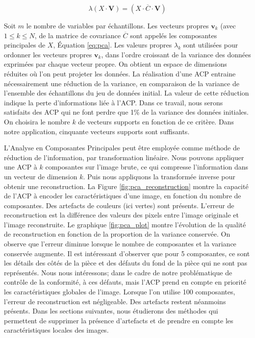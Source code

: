 \begin{equation} \label{eq:pca}
\lambda\left(X \cdot \mathbf{V}\right)=\left(X \cdot \overline{C} \cdot \mathbf{V}\right)
\end{equation}

Soit $m$ le nombre de variables par échantillons. Les vecteurs propres $\mathbf{v}_k$ (avec $1 \leq k \leq N$, de la matrice de covariance $\overline{C}$ sont appelés les composantes principales de $X$, Équation \ref{eq:pca}.
Les valeurs propres $\lambda_k$ sont utilisées pour ordonner les vecteurs propres $\mathbf{v}_k$, dans l'ordre croissant de la variance des données exprimées par chaque vecteur propre.
On obtient un espace de dimensions réduites où l'on peut projeter les données.
La réalisation d'une ACP entraine nécessairement une réduction de la variance, en comparaison de la variance de l'ensemble des échantillons du jeu de données initial.
La valeur de cette réduction indique la perte d'informations liée à l'ACP.
Dans ce travail, nous serons satisfaits des ACP qui ne font perdre que 1\% de la variance des données initiales.
On choisira le nombre $k$ de vecteurs supports en fonction de ce critère.
Dans notre application, cinquante vecteurs supports sont suffisants. 

L'Analyse en Composantes Principales peut être employée comme méthode de réduction de l'information, par transformation linéaire.
Nous pouvons appliquer une ACP à $k$ composantes sur l'image brute, ce qui compresse l'information dans un vecteur de dimension $k$.
Puis nous appliquons la transformée inverse pour obtenir une reconstruction.
La Figure \ref{fig:pca_reconstruction} montre la capacité de l'ACP à encoder les caractéristiques d'une image, en fonction du nombre de composantes.
Des artefacts de couleurs (ici vertes) sont présents.
L'erreur de reconstruction est la différence des valeurs des pixels entre l'image originale et l'image reconstruite.
Le graphique \ref{fig:pca_plot} montre l'évolution de la qualité de reconstruction en fonction de la proportion de la variance conservée.
On observe que l'erreur diminue lorsque le nombre de composantes et la variance conservée augmente.
Il est intéressant d'observer que pour 5 composantes, ce sont les détails des côtés de la pièce et des défauts du fond de la pièce qui ne sont pas représentés.
Nous nous intéressons; dans le cadre de notre problématique de contrôle de la conformité, à ces défauts, mais l'ACP prend en compte en priorité les caractéristiques globales de l'image.
Lorsque l'on utilise 100 composantes, l'erreur de reconstruction est négligeable.
Des artefacts restent néanmoins présents.
Dans les sections suivantes, nous étudierons des méthodes qui permettent de supprimer la présence d'artefacts et de prendre en compte les caractéristiques locales des images.

